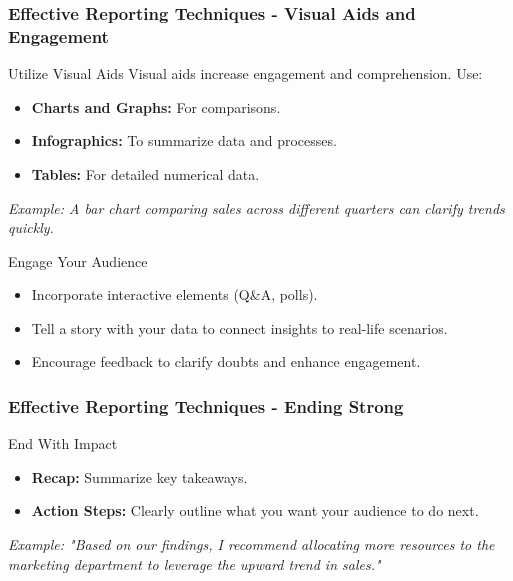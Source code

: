\documentclass[aspectratio=169]{beamer}
\begin{document}
\begin{frame}[fragile]
    \frametitle{Effective Reporting Techniques - Visual Aids and Engagement}
    \begin{block}{Utilize Visual Aids}
        Visual aids increase engagement and comprehension. Use:
        \begin{itemize}
            \item \textbf{Charts and Graphs:} For comparisons. 
            \item \textbf{Infographics:} To summarize data and processes.
            \item \textbf{Tables:} For detailed numerical data.
        \end{itemize}
        \textit{Example: A bar chart comparing sales across different quarters can clarify trends quickly.}
    \end{block}
    
    \begin{block}{Engage Your Audience}
        \begin{itemize}
            \item Incorporate interactive elements (Q&A, polls).
            \item Tell a story with your data to connect insights to real-life scenarios.
            \item Encourage feedback to clarify doubts and enhance engagement.
        \end{itemize}
    \end{block}
\end{frame}

\begin{frame}[fragile]
    \frametitle{Effective Reporting Techniques - Ending Strong}
    \begin{block}{End With Impact}
        \begin{itemize}
            \item \textbf{Recap:} Summarize key takeaways.
            \item \textbf{Action Steps:} Clearly outline what you want your audience to do next.
        \end{itemize}
        \textit{Example: "Based on our findings, I recommend allocating more resources to the marketing department to leverage the upward trend in sales."}
    \end{block}
\end{frame}
\end{document}
